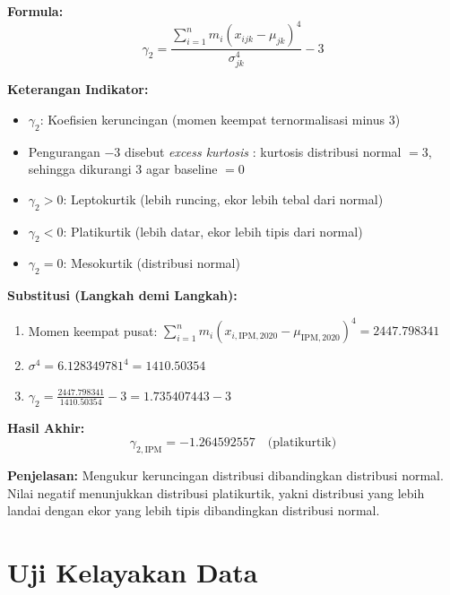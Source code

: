 \documentclass[11pt,a4paper]{article}
\begin{document}
\begin{tcolorbox}[formula_box, title={Koefisien Keruncingan (\textit{Excess Kurtosis}) Populasi ($\gamma_2$)}]
\textbf{Formula:}
\[ \gamma_2 = \frac{\sum_{i=1}^{n} m_i (x_{ijk} - \mu_{jk})^4}{\sigma_{jk}^4} - 3 \]

\textbf{Keterangan Indikator:}
\begin{itemize}
  \item $\gamma_2$: Koefisien keruncingan (momen keempat ternormalisasi minus 3)
  \item Pengurangan $-3$ disebut \textit{excess kurtosis} \citet{mathworld}: kurtosis distribusi normal $= 3$, sehingga dikurangi 3 agar baseline $= 0$
  \item $\gamma_2 > 0$: Leptokurtik (lebih runcing, ekor lebih tebal dari normal)
  \item $\gamma_2 < 0$: Platikurtik (lebih datar, ekor lebih tipis dari normal)
  \item $\gamma_2 = 0$: Mesokurtik (distribusi normal)
\end{itemize}

\textbf{Substitusi (Langkah demi Langkah):}
\begin{enumerate}
  \item Momen keempat pusat: $\sum_{i=1}^{n} m_i (x_{i,\text{IPM},2020} - \mu_{\text{IPM},2020})^4 = 2447.798341$
  \item $\sigma^4 = 6.128349781^4 = 1410.50354$
  \item $\gamma_2 = \frac{2447.798341}{1410.50354} - 3 = 1.735407443 - 3$
\end{enumerate}

\textbf{Hasil Akhir:}
\[ \gamma_{2,\text{IPM}} = -1.264592557 \quad \text{(platikurtik)} \]

\textbf{Penjelasan:} Mengukur keruncingan distribusi dibandingkan distribusi normal. Nilai negatif menunjukkan distribusi platikurtik, yakni distribusi yang lebih landai dengan ekor yang lebih tipis dibandingkan distribusi normal.
\end{tcolorbox}


\section{Uji Kelayakan Data}
\end{document}
